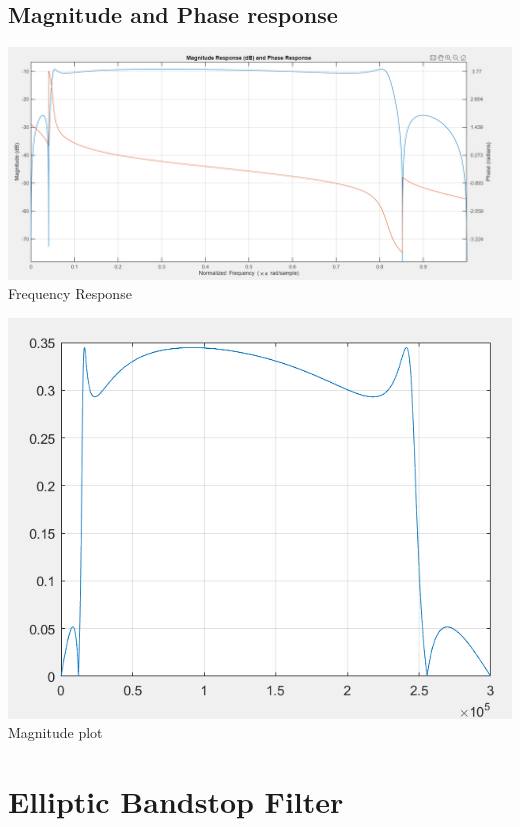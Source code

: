 \documentclass{article}
\begin{document}
\subsection{Magnitude and Phase response}

\begin{center}
    \includegraphics[scale=0.45]{freq_bandpass_ellip.png}\\
    Frequency Response
\end{center}

\begin{center}
    \includegraphics[scale=0.75]{mag_bandpass_ellip.png}\\
    Magnitude plot
\end{center}

\newpage

\section{Elliptic Bandstop Filter}
\end{document}
